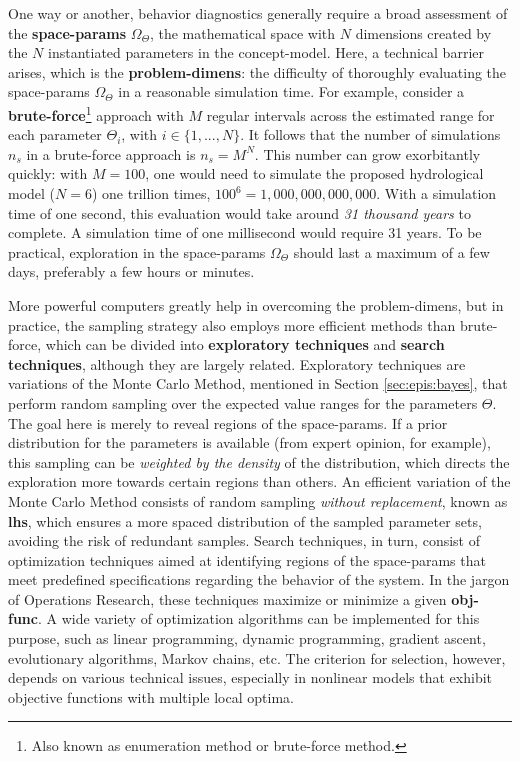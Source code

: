 \documentclass[./main_en.tex]{subfiles}
\begin{document}
\par One way or another, behavior diagnostics generally require a broad assessment of the \textbf{\gls{space-params}} $\Omega_{\Theta}$, the mathematical space with $N$ dimensions created by the $N$ instantiated \gls{parameters} in the \gls{concept-model}. Here, a technical barrier arises, which is the \textbf{\gls{problem-dimens}}: the difficulty of thoroughly evaluating the \gls{space-params} $\Omega_{\Theta}$ in a reasonable simulation time. For example, consider a \textbf{\gls{brute-force}}\footnote{Also known as enumeration method or brute-force method.} approach with $M$ regular intervals across the estimated range for each parameter $\Theta_i$, with $i \in \{1, ..., N\}$. It follows that the number of simulations $n_s$ in a \gls{brute-force} approach is $n_s = M^N$. This number can grow exorbitantly quickly: with $M=100$, one would need to simulate the proposed hydrological \gls{model} ($N=6$) one trillion times, $100^6 = 1,000,000,000,000$. With a simulation time of one second, this evaluation would take around \textit{31 thousand years} to complete. A simulation time of one millisecond would require 31 years. To be practical, exploration in the \gls{space-params} $\Omega_{\Theta}$ should last a maximum of a few days, preferably a few hours or minutes.

\par More powerful computers greatly help in overcoming the \gls{problem-dimens}, but in practice, the sampling strategy also employs more efficient methods than \gls{brute-force}, which can be divided into \textbf{exploratory techniques} and \textbf{search techniques}, although they are largely related. Exploratory techniques are variations of the Monte Carlo Method, mentioned in Section \ref{sec:epis:bayes}, that perform random sampling over the expected value ranges for the \gls{parameters} $\Theta$. The goal here is merely to reveal regions of the \gls{space-params}. If a prior distribution for the \gls{parameters} is available (from expert opinion, for example), this sampling can be \textit{weighted by the density} of the distribution, which directs the exploration more towards certain regions than others. An efficient variation of the Monte Carlo Method consists of random sampling \textit{without replacement}, known as \textbf{\gls{lhs}}, which ensures a more spaced distribution of the sampled parameter sets, avoiding the risk of redundant samples. Search techniques, in turn, consist of optimization techniques aimed at identifying regions of the \gls{space-params} that meet predefined specifications regarding the behavior of the \gls{system}. In the jargon of Operations Research, these techniques maximize or minimize a given \textbf{\gls{obj-func}}. A wide variety of optimization algorithms can be implemented for this purpose, such as linear programming, dynamic programming, gradient ascent, evolutionary algorithms, Markov chains, etc. The criterion for selection, however, depends on various technical issues, especially in nonlinear models that exhibit objective functions with multiple local optima.
\end{document}
